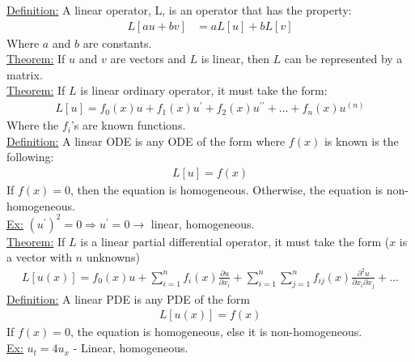 \documentclass{article}
\newcommand{\p}{\partial }
\newcommand{\ex}{\underline{Ex:} }
\newcommand{\dfn}{\underline{Definition:} }
\newcommand{\thm}{\underline{Theorem:} }
\begin{document}
\dfn A linear operator, L, is an operator that has the property:
\begin{align}
  L[au + bv] & = aL[u] + bL[v]
\end{align}
Where $a$ and $b$ are constants.\\
\thm If $u$ and $v$ are vectors and $L$ is linear, then $L$ can be represented by a matrix.\\
\thm If $L$ is linear ordinary operator, it must take the form:
\begin{align}
  L[u] = f_0(x)u + f_1(x)u^\prime + f_2(x)u^{\prime\prime} + \ldots + f_n(x)u^{(n)}
\end{align}
Where the $f_i$'s are known functions.\\
\dfn A linear ODE is any ODE of the form where $f(x)$ is known is the following:
\begin{align}
  L[u] = f(x)
\end{align}
If $f(x) = 0$, then the equation is homogeneous. Otherwise, the equation is non-homogeneous.\\
\ex $(u^\prime)^2 = 0 \Rightarrow u^\prime = 0 \rightarrow$ linear, homogeneous.\\
\thm If $L$ is a linear partial differential operator, it must take the form ($x$ is a vector with $n$ unknowns)
\begin{align}
  L[u(x)] = f_0(x)u + \sum^n_{i = 1} f_i(x) \frac{\partial u}{\partial x_i} +
  \sum^n_{i = 1} \sum^n_{j = 1} f_{ij}(x) \frac{\p^2 u}{\p x_i \p x_j} + \ldots
\end{align}
\dfn A linear PDE is any PDE of the form
\begin{align}
  L[u(x)] = f(x)
\end{align}
If $f(x) = 0$, the equation is homogeneous, else it is non-homogeneous.\\
\ex $u_t = 4u_x$ - Linear, homogeneous.
\newpage
\end{document}
